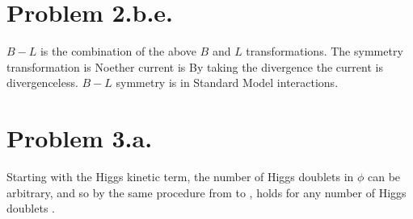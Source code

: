\documentclass{article}
\begin{document}
\section*{Problem 2.b.e.}
$B-L$ is the combination of the above $B$ and $L$ transformations. The symmetry transformation is 
Noether current is
By taking the divergence
the current is divergenceless. $B-L$ symmetry is  in Standard Model interactions.
\section*{Problem 3.a.}
Starting with the Higgs kinetic term,
the number of Higgs doublets in $\phi$ can be arbitrary, and so by the same procedure from  to ,
holds for any number of Higgs doublets \cite{LANGACKER1981185}.
\end{document}
